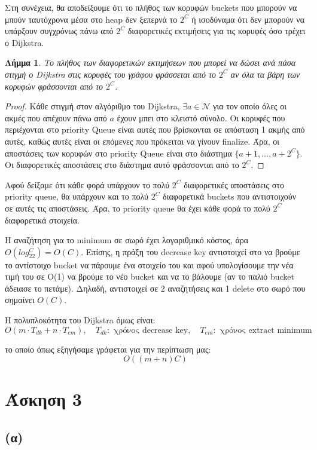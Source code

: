 \documentclass[a4paper,oneside, 11pt]{article}
\newtheorem{lemma}{Λήμμα}
\begin{document}
Στη συνέχεια, θα αποδείξουμε ότι το πλήθος των κορυφών buckets που μπορούν να μπούν ταυτόχρονα μέσα στο heap δεν ξεπερνά το $2^C$ ή ισοδύναμα ότι δεν μπορούν να υπάρξουν συγχρόνως πάνω από $2^C$ διαφορετικές εκτιμήσεις για τις κορυφές όσο τρέχει ο Dijkstra.
\begin{lemma}Tο πλήθος των διαφορετικών εκτιμήσεων που μπορεί να δώσει ανά πάσα στιγμή ο Dijkstra στις κορυφές του γράφου φράσσεται από το $2^C$ αν όλα τα βάρη των κορυφών φράσσονται από το $2^C$. \end{lemma}

\begin{proof}
	\item 
	Κάθε στιγμή στον αλγόριθμο του Dijkstra, $\exists a \in \mathcal{N}$ για τον οποίο όλες οι ακμές που απέχουν πάνω από $a$ έχουν μπει στο κλειστό σύνολο. Οι κορυφές που περιέχονται στο priority Queue είναι αυτές που βρίσκονται σε απόσταση 1 ακμής από αυτές, καθώς αυτές είναι οι επόμενες που πρόκειται να γίνουν finalize. Άρα, οι αποστάσεις των κορυφών στο priority Queue είναι στο διάστημα $\{a+1, ..., a + 2^C\}$. Οι διαφορετικές αποστάσεις στο διάστημα αυτό φράσσονται από το $2^C$.
\end{proof}

Αφού δείξαμε ότι κάθε φορά υπάρχουν το πολύ $2^C$ διαφορετικές αποστάσεις στο priority queue, θα υπάρχουν και το πολύ $2^C$ διαφορετικά buckets που αντιστοιχούν σε αυτές τις αποστάσεις. Άρα, το priority queue θα έχει κάθε φορά το πολύ $2^C$ διαφορετικά στοιχεία. \bigbreak

Η αναζήτηση για το minimum σε σωρό έχει λογαριθμικό κόστος, άρα $O(log_22^C) = O(C)$. Επίσης, η πράξη του decrease key αντιστοιχεί στο να βρούμε το αντίστοιχο bucket να πάρουμε ένα στοιχείο του και αφού υπολογίσουμε την νέα τιμή του σε O(1) να βρούμε το νέο bucket και να το βάλουμε (αν το παλιό bucket άδειασε το πετάμε). Δηλαδή, αντιστοιχεί σε 2 αναζητήσεις και 1 delete στο σωρό που σημαίνει $O(C)$. \bigbreak

Η πολυπλοκότητα του Dijkstra όμως είναι:
$$
O(m\cdot T_{dk} + n\cdot T_{em}), \quad T_{dk}: \textrm{ χρόνος decrease key}, \quad T_{em}: \textrm{ χρόνος extract minimum}
$$

το οποίο όπως εξηγήσαμε γράφεται για την περίπτωση μας:
$$
O( (m+n) C)
$$
\section{Άσκηση 3}
\subsection{(α)}
\end{document}
